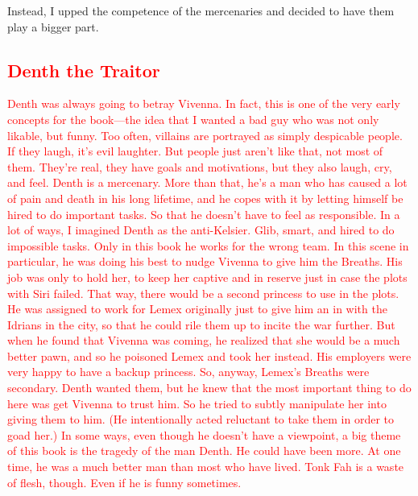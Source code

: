 Instead, I upped the competence of the mercenaries and decided to have them play a bigger part.

\textcolor{red}{
\subsection*{Denth the Traitor}
}
\textcolor{red}{
Denth was always going to betray Vivenna. In fact, this is one of the very early concepts for the book—the idea that I wanted a bad guy who was not only likable, but funny. Too often, villains are portrayed as simply despicable people. If they laugh, it’s evil laughter.
}
\textcolor{red}{
But people just aren’t like that, not most of them. They’re real, they have goals and motivations, but they also laugh, cry, and feel. Denth is a mercenary. More than that, he’s a man who has caused a lot of pain and death in his long lifetime, and he copes with it by letting himself be hired to do important tasks. So that he doesn’t have to feel as responsible.
}
\textcolor{red}{
In a lot of ways, I imagined Denth as the anti-Kelsier. Glib, smart, and hired to do impossible tasks. Only in this book he works for the wrong team. In this scene in particular, he was doing his best to nudge Vivenna to give him the Breaths. His job was only to hold her, to keep her captive and in reserve just in case the plots with Siri failed. That way, there would be a second princess to use in the plots. He was assigned to work for Lemex originally just to give him an in with the Idrians in the city, so that he could rile them up to incite the war further. But when he found that Vivenna was coming, he realized that she would be a much better pawn, and so he poisoned Lemex and took her instead. His employers were very happy to have a backup princess.
}
\textcolor{red}{
So, anyway, Lemex’s Breaths were secondary. Denth wanted them, but he knew that the most important thing to do here was get Vivenna to trust him. So he tried to subtly manipulate her into giving them to him. (He intentionally acted reluctant to take them in order to goad her.)
}
\textcolor{red}{
In some ways, even though he doesn’t have a viewpoint, a big theme of this book is the tragedy of the man Denth. He could have been more. At one time, he was a much better man than most who have lived.
}
\textcolor{red}{
Tonk Fah is a waste of flesh, though. Even if he is funny sometimes.
}




